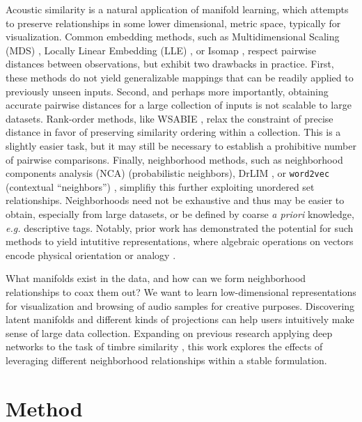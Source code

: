\documentclass{article}
\begin{document}
Acoustic similarity is a natural application of manifold learning, which attempts to preserve relationships in some lower dimensional, metric space, typically for visualization.
Common embedding methods, such as Multidimensional Scaling (MDS) \cite{}, Locally Linear Embedding (LLE) \cite{}, or Isomap \cite{}, respect pairwise distances between observations, but exhibit two drawbacks in practice.
First, these methods do not yield generalizable mappings that can be readily applied to previously unseen inputs.
Second, and perhaps more importantly, obtaining accurate pairwise distances for a large collection of inputs is not scalable to large datasets.
Rank-order methods, like WSABIE \cite{weston2011wsabie}, relax the constraint of precise distance in favor of preserving similarity ordering within a collection.
This is a slightly easier task, but it may still be necessary to establish a prohibitive number of pairwise comparisons.
Finally, neighborhood methods, such as neighborhood components analysis (NCA) \cite{hinton2004neighborhood} (probabilistic neighbors), DrLIM \cite{hadsell2006drlim}, or \texttt{word2vec} (contextual ``neighbors'') \cite{mikolov2013distributed}, simplifiy this further exploiting unordered set relationships.
Neighborhoods need not be exhaustive and thus may be easier to obtain, especially from large datasets, or be defined by coarse \emph{a priori} knowledge, \emph{e.g.} descriptive tags.
Notably, prior work has demonstrated the potential for such methods to yield intutitive representations, where algebraic operations on vectors encode physical orientation \cite{hadsell2006drlim} or analogy \cite{mikolov2013efficient}.


What manifolds exist in the data, and how can we form neighborhood relationships to coax them out?
We want to learn low-dimensional representations for visualization and browsing of audio samples for creative purposes.
Discovering latent manifolds and different kinds of projections can help users intuitively make sense of large data collection.
Expanding on previous research applying deep networks to the task of timbre similarity \cite{humphrey2015dl4mir}, this work explores the effects of leveraging different neighborhood relationships within a stable formulation.



\section{Method}
\end{document}
